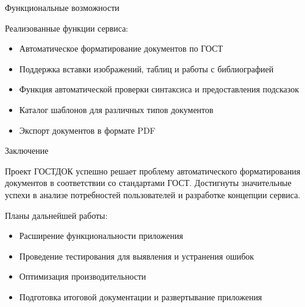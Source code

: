 \documentclass[final]{beamer}
\newlength{\onecolwid}
\begin{document}
\begin{frame}[t]
\begin{columns}[t]
\begin{column}{\onecolwid} %


\begin{block}{Функциональные возможности}

Реализованные функции сервиса:
\begin{itemize}
\item Автоматическое форматирование документов по ГОСТ
\item Поддержка вставки изображений, таблиц и работы с библиографией
\item Функция автоматической проверки синтаксиса и предоставления подсказок
\item Каталог шаблонов для различных типов документов
\item Экспорт документов в формате PDF
\end{itemize}

\end{block}


\begin{block}{Заключение}

Проект ГОСТДОК успешно решает проблему автоматического форматирования документов в соответствии со стандартами ГОСТ. Достигнуты значительные успехи в анализе потребностей пользователей и разработке концепции сервиса.

Планы дальнейшей работы:
\begin{itemize}
\item Расширение функциональности приложения
\item Проведение тестирования для выявления и устранения ошибок
\item Оптимизация производительности
\item Подготовка итоговой документации и развертывание приложения
\end{itemize}

\end{block}



\end{column}
\end{columns}
\end{frame}
\end{document}
